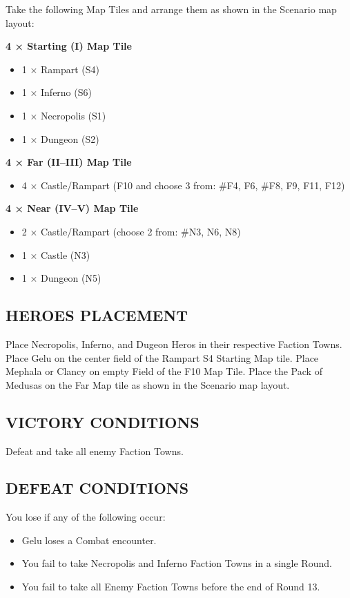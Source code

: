 \begin{multicols*}{2}
Take the following Map Tiles and arrange them as shown in the Scenario map layout:

\textbf{4 × Starting (I) Map Tile}
\begin{itemize}
  \item 1 × Rampart (S4)
  \item 1 × Inferno (S6)
  \item 1 × Necropolis (S1)
  \item 1 × Dungeon (S2)
\end{itemize}

\textbf{4 × Far (II--III) Map Tile}
\begin{itemize}
  \item 4 × Castle/Rampart (F10 and choose 3 from: \#F4, F6, \#F8, F9, F11, F12)
\end{itemize}

\textbf{4 × Near (IV--V) Map Tile}
\begin{itemize}
  \item 2 × Castle/Rampart (choose 2 from: \#N3, N6, N8)
  \item 1 × Castle (N3)
  \item 1 × Dungeon (N5)
\end{itemize}

\subsection*{\MakeUppercase{Heroes Placement}}

Place Necropolis, Inferno, and Dugeon Heros in their respective Faction Towns.
Place Gelu on the center field of the Rampart S4 Starting Map tile.
Place Mephala or Clancy on empty Field of the F10 Map Tile.
Place the Pack of Medusas on the Far Map tile as shown in the Scenario map layout.

\subsection*{\MakeUppercase{Victory Conditions}}

Defeat and take all enemy Faction Towns.

\subsection*{\MakeUppercase{Defeat Conditions}}

You lose if any of the following occur:
\begin{itemize}
  \item Gelu loses a Combat encounter.
  \item You fail to take Necropolis and Inferno Faction Towns in a single Round.
  \item You fail to take all Enemy Faction Towns before the end of Round 13.
\end{itemize}


\end{multicols*}
